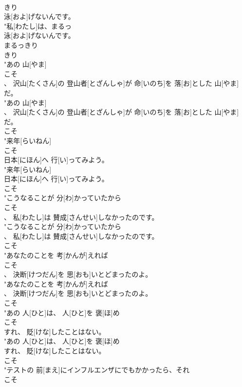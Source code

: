 \documentclass[8pt]{extreport}
\begin{document}
\begin{CJK}{UTF8}{min}
\\	きり
\\	泳[およ]げないんです。
\\	"私[わたし]は、まるっ
\\	泳[およ]げないんです。
\\	まるっきり	
\\	きり
\\	"あの 山[やま]
\\	こそ
\\	、 沢山[たくさん]の 登山者[とざんしゃ]が 命[いのち]を 落[お]とした 山[やま]だ。
\\	"あの 山[やま]
\\	、 沢山[たくさん]の 登山者[とざんしゃ]が 命[いのち]を 落[お]とした 山[やま]だ。
\\	こそ
\\	"来年[らいねん]
\\	こそ
\\	日本[にほん]へ 行[い]ってみよう。
\\	"来年[らいねん]
\\	日本[にほん]へ 行[い]ってみよう。
\\	こそ
\\	"こうなることが 分[わ]かっていたから
\\	こそ
\\	、 私[わたし]は 賛成[さんせい]しなかったのです。
\\	"こうなることが 分[わ]かっていたから
\\	、 私[わたし]は 賛成[さんせい]しなかったのです。
\\	こそ
\\	"あなたのことを 考[かんが]えれば
\\	こそ
\\	、 決断[けつだん]を 思[おも]いとどまったのよ。
\\	"あなたのことを 考[かんが]えれば
\\	、 決断[けつだん]を 思[おも]いとどまったのよ。
\\	こそ
\\	"あの 人[ひと]は、 人[ひと]を 褒[ほ]め
\\	こそ
\\	すれ、 貶[けな]したことはない。
\\	"あの 人[ひと]は、 人[ひと]を 褒[ほ]め
\\	すれ、 貶[けな]したことはない。
\\	こそ
\\	"テストの 前[まえ]にインフルエンザにでもかかったら、それ
\\	こそ

\end{CJK}
\end{document}

